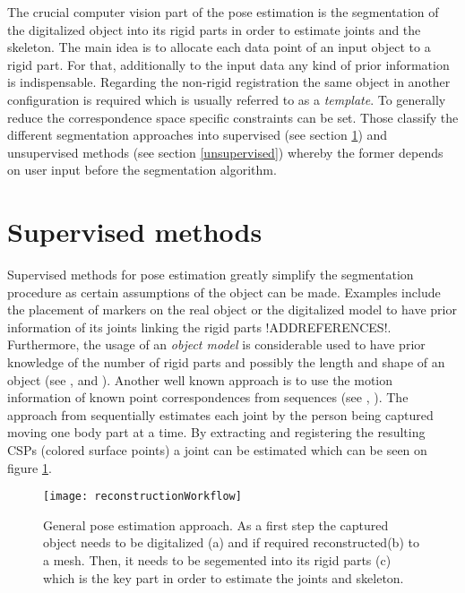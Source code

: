 The crucial computer vision part of the pose estimation is the segmentation of the digitalized object into its rigid parts in order to estimate joints and the skeleton. The main idea is to allocate each data point of an input object to a rigid part. For that, additionally to the input data any kind of prior information is indispensable. Regarding the non-rigid registration the same object in another configuration is required which is usually referred to as a \textit{template}. To generally reduce the correspondence space specific constraints can be set. Those classify the different segmentation approaches into supervised (see section \ref{supervised}) and unsupervised methods (see section \ref{unsupervised}) whereby the former depends on user input before the segmentation algorithm. 

\section{Supervised methods}
\label{supervised}

Supervised methods for pose estimation greatly simplify the segmentation procedure as certain assumptions of the object can be made. Examples include the placement of markers on the real object or the digitalized model to have prior information of its joints linking the rigid parts !ADDREFERENCES!. Furthermore, the usage of an \textit{object model} is considerable used to have prior knowledge of the number of rigid parts and possibly the length and shape of an object (see \cite{multiLayerSkeleton}, \cite{de2008hierarchical} and \cite{michoud2007real}). Another well known approach is to use the motion information of known point correspondences from sequences (see \cite{segmentationMotion}, \cite{animatedObjects}). The approach from \cite{sfsMocap} sequentially estimates each joint by the person being captured moving one body part at a time. By extracting and registering the resulting CSPs (colored surface points) a joint can be estimated which can be seen on figure \ref{fig:supervisedMotion}.


\begin{figure}[H]
	\centering
	\texttt{[image: reconstructionWorkflow]}
	\caption{General pose estimation approach. As a first step the captured object needs to be digitalized (a) and if required reconstructed(b) to a mesh. Then, it needs to be segemented into its rigid parts (c) which is the key part in order to estimate the joints and skeleton.}
	\label{fig:supervisedMotion}
\end{figure}


